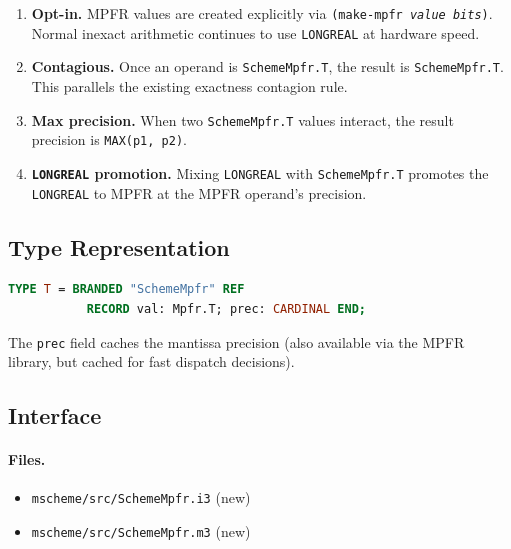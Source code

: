 \documentclass[12pt]{article}
\begin{document}
\begin{enumerate}[nosep]
\item \textbf{Opt-in.}  MPFR values are created explicitly via
  {\tt (make-mpfr \emph{value} \emph{bits})}.  Normal inexact
  arithmetic continues to use {\tt LONGREAL} at hardware speed.
\item \textbf{Contagious.}  Once an operand is {\tt SchemeMpfr.T},
  the result is {\tt SchemeMpfr.T}.  This parallels the existing
  exactness contagion rule.
\item \textbf{Max precision.}  When two {\tt SchemeMpfr.T} values
  interact, the result precision is {\tt MAX(p1, p2)}.
\item \textbf{{\tt LONGREAL} promotion.}  Mixing {\tt LONGREAL}
  with {\tt SchemeMpfr.T} promotes the {\tt LONGREAL} to MPFR
  at the MPFR operand's precision.
\end{enumerate}

\subsection{Type Representation}

\begin{lstlisting}[language=Modula3]
TYPE T = BRANDED "SchemeMpfr" REF
           RECORD val: Mpfr.T; prec: CARDINAL END;
\end{lstlisting}

\noindent The {\tt prec} field caches the mantissa precision (also
available via the MPFR library, but cached for fast dispatch
decisions).

\subsection{Interface}

\paragraph{Files.}
\begin{itemize}[nosep]
\item {\tt mscheme/src/SchemeMpfr.i3} (new)
\item {\tt mscheme/src/SchemeMpfr.m3} (new)
\end{itemize}
\end{document}
